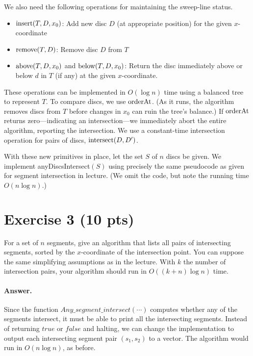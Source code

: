 \documentclass[a4paper]{article}
\begin{document}
We also need the following operations for maintaining the sweep-line status.
\begin{itemize}
\item $\text{insert}(T, D, x_0)$: Add new disc $D$ (at appropriate position) for the given $x$-coordinate
\item $\text{remove}(T,D)$: Remove disc $D$ from $T$
\item $\text{above}(T,D,x_0)$ and $\text{below}(T,D,x_0)$: Return the disc immediately above or below $d$ in $T$ (if any) at the given $x$-coordinate.
\end{itemize}
These operations can be implemented in $O(\log n)$ time using a balanced tree to represent $T$.
To compare discs, we use $\text{orderAt}$.
(As it runs, the algorithm removes discs from $T$ before changes in $x_0$ can ruin the tree's balance.)
If $\text{orderAt}$ returns zero---indicating an intersection---we immediately abort the entire algorithm, reporting the intersection.
{\CHANGE We use a constant-time intersection operation for pairs of discs, $\text{intersect}(D, D')$.}

With these new primitives in place, let the set $S$ of $n$ discs be given.
We implement anyDiscsIntersect$(S)$ using precisely the same pseudocode as given for segment intersection in lecture.
(We omit the code, but note the running time $O(n \log n)$.)

\section*{Exercise 3 (10 pts)}

For a set of $n$ segments, give an algorithm that lists all pairs of intersecting segments, sorted by the $x$-coordinate of the intersection point. You can suppose the same simplifying assumptions as in the lecture. With $k$ the number of intersection pairs, your algorithm should run in $O((k + n) \log n)$ time.

\paragraph{Answer.}

Since the function ${Any\_segment\_intersect}(\cdots)$ computes whether any of the segments intersect, it must be able to print all the intersecting segments. Instead of returning ${true}$ or ${false}$ and halting, we can change the implementation to output each intersecting segment pair $(s_1, s_2)$ to a vector. The algorithm would run in $O(n \log n)$, as before.
\end{document}
